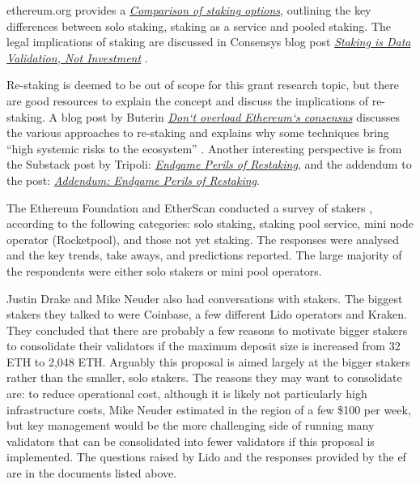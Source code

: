 \documentclass{article}
\begin{document}
ethereum.org provides a \href{https://ethereum.org/en/staking/#comparison-of-options}{\textit{Comparison of staking options}},
outlining the key differences between solo staking, staking as a service and 
pooled staking. The legal implications of staking are discussed in Consensys 
blog post \href{https://consensys.net/blog/news/staking-is-data-validation-not-investment/}{\textit{Staking is Data Validation, Not Investment}} \cite{corva2023}.

Re-staking is deemed to be out of scope for this grant research topic, but
there  are good resources to explain the concept and discuss the implications
of re-staking. A blog post by Buterin
\href{https://vitalik.ca/general/2023/05/21/dont\_overload.html}{\textit{Don`t overload Ethereum`s consensus}}
discusses the various approaches to re-staking and explains why some techniques
bring ``high systemic risks to the ecosystem'' \cite{buterin2023a}. Another
interesting perspective is from the Substack post by Tripoli:
\href{https://dataalways.substack.com/p/endgame-perils-of-restaking}{\textit{Endgame Perils of Restaking}},
and the addendum to the post:
\href{https://dataalways.substack.com/p/addendum-endgame-perils-of-restaking}{\textit{Addendum: Endgame Perils of Restaking}}.

The Ethereum Foundation and EtherScan conducted a survey of stakers
\cite{Smith2023}, according to the following categories: solo staking, staking
pool service, mini node operator (Rocketpool), and those not yet staking. The
responses were analysed and the key trends, take aways, and predictions
reported. The large majority of the respondents were either solo stakers or
mini pool operators.

Justin Drake and Mike Neuder also had conversations with stakers. The biggest
stakers they talked to were Coinbase, a few different Lido operators and
Kraken. They concluded that there are probably a few reasons to motivate bigger
stakers to consolidate their validators if the maximum deposit size is
increased from 32 ETH to 2,048 ETH. Arguably this proposal is aimed largely at
the bigger stakers rather than the smaller, solo stakers. The reasons they may
want to consolidate are: to reduce operational cost, although it is likely not
particularly high infrastructure costs, Mike Neuder estimated in the region of
a few \$100 per week, but key management would be the more challenging side of
running many validators that can be consolidated into fewer validators if this
proposal is implemented. The questions raised by Lido and the responses
provided by the \gls{ef} are in the documents listed above.
\end{document}
